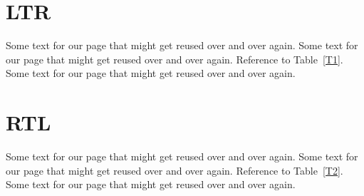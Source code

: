 \documentclass{article}
\newcommand\sample{Some text for our page
  that might get reused over and over again. }
\begin{document}
\section{LTR}
\begin{table}
 \centering
{}
 \caption{The Caption}\label{T1}
\end{table}

\sample \sample Reference to Table~\ref{T1}.
\sample

\section{RTL}
\setRTL

\begin{table}
 \centering
{}
 \caption{The Caption}\label{T2}
\end{table}

\sample \sample Reference to Table~\ref{T2}.
\sample
\end{document}
